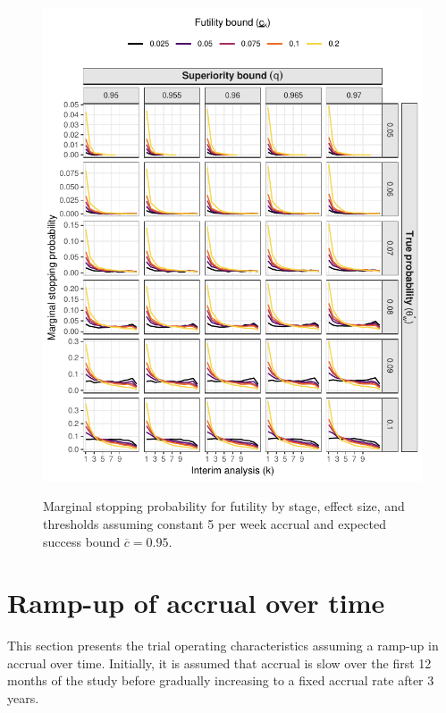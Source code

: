 \documentclass{article}
\begin{document}
\begin{figure}[!ht]
	\caption{Marginal stopping probability for futility by stage, effect size, and thresholds assuming constant 5 per week accrual and expected success bound $\overline{c}=0.95$.}
	\includegraphics{figures/stop_futility_5.pdf}
	\label{fig:stop_futility_5}
\end{figure}

\clearpage

\section{Ramp-up of accrual over time}

This section presents the trial operating characteristics assuming a ramp-up in accrual over time.
Initially, it is assumed that accrual is slow over the first 12 months of the study before gradually increasing to a fixed accrual rate after 3 years.
\end{document}
